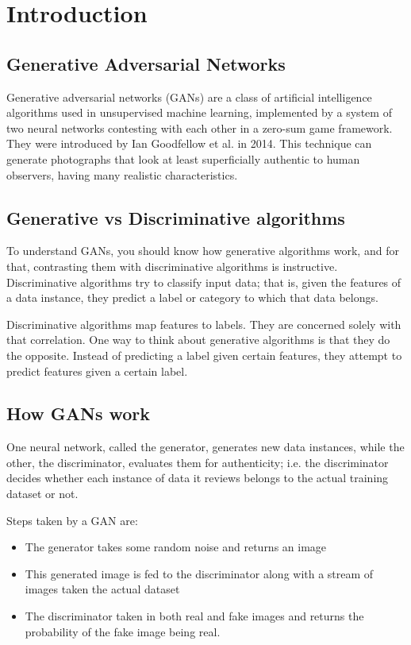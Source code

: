 \chapter{Introduction}
    \section{Generative Adversarial Networks}
    Generative adversarial networks (GANs) are a class of artificial intelligence 
    algorithms used in unsupervised machine learning, implemented by a system of 
    two neural networks contesting with each other in a zero-sum game framework. 
    They were introduced by Ian Goodfellow et al. in 2014\cite{base}. This technique 
    can generate photographs that look at least superficially authentic to human 
    observers, having many realistic characteristics.\cite{improvedtechniques}

    \section{Generative vs Discriminative algorithms}
    To understand GANs, you should know how generative algorithms work, and for 
    that, contrasting them with discriminative algorithms is instructive. 
    Discriminative algorithms try to classify input data; that is, given the 
    features of a data instance, they predict a label or category to which that 
    data belongs.


    Discriminative algorithms map features to labels. They are concerned solely 
    with that correlation. One way to think about generative algorithms is that 
    they do the opposite. Instead of predicting a label given certain features, 
    they attempt to predict features given a certain label.

    \section{How GANs work}

    One neural network, called the generator, generates new data instances, while 
    the other, the discriminator, evaluates them for authenticity; i.e. the 
    discriminator decides whether each instance of data it reviews belongs to the 
    actual training dataset or not.\cite{fourj}

    Steps taken by a GAN are:
    \begin{itemize}
    \item{The generator takes some random noise and returns an image}
    \item{This generated image is fed to the discriminator along with a stream of 
    images taken the actual dataset}
    \item{The discriminator taken in both real and fake images and returns the 
    probability of the fake image being real.}
\end{itemize}